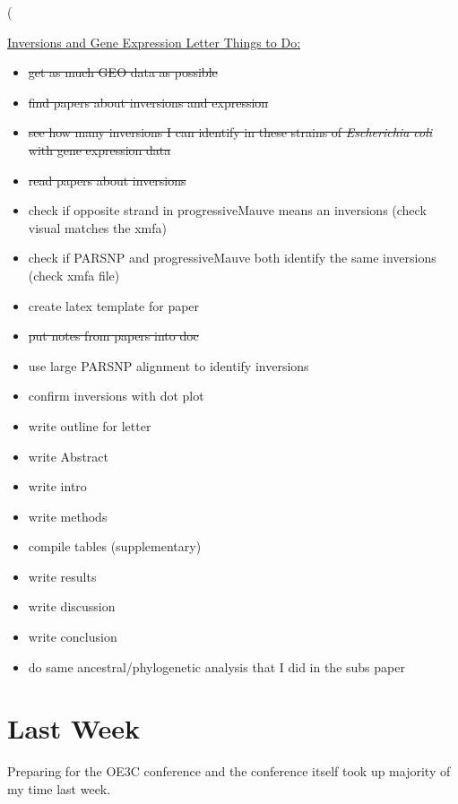 \left( \documentclass[12pt]{article}
\newcommand{\p}{progressiveMauve\xspace}
\newcommand{\ecoli}{\textit{Escherichia coli}\xspace}
\begin{document}
\underline{Inversions and Gene Expression Letter Things to Do:}
\begin{itemize}
	\item \sout{get as much GEO data as possible}
	\item \sout{find papers about inversions and expression}
	
	\item \sout{see how many inversions I can identify in these strains of \ecoli with gene expression data}
	
	\item \sout{read papers about inversions}
	
	
	\item check if opposite strand in \p means an inversions (check visual matches the xmfa)
	
	\item check if PARSNP and \p both identify the same inversions (check xmfa file)
	\item create latex template for paper
	\item \sout{put notes from papers into doc}
	\item use large PARSNP alignment to identify inversions
	\item confirm inversions with dot plot
	\item write outline for letter
	\item write Abstract
	\item write intro
	\item write methods
	\item compile tables (supplementary)
	\item write results
	\item write discussion
	\item write conclusion 
	\item do same ancestral/phylogenetic analysis that I did in the subs paper 
\end{itemize}



	
\section*{Last Week}

Preparing for the OE3C conference and the conference itself took up majority of my time last week.
\end{document}
